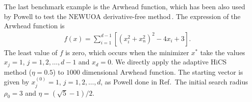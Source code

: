 \documentclass[final,1p,times]{elsarticle}
\begin{document}
%
The last benchmark example is the Arwhead function, which has been
also used by Powell to test the NEWUOA derivative-free
method\,\cite{powell2006newuoa}. The expression of the Arwhead function is
\begin{align}
	f(x) = \sum_{i=1}^{d-1}[(x_i^2+x_n^2)^2 - 4 x_i +3].
	\label{}
\end{align}
The least value of $f$ is zero, which occurs when the minimizer
$x^*$ take the values $x_j=1$, $j=1,2,\dots,d-1$ and $x_d=0$. 
We directly apply the adaptive HiCS method ($\eta=0.5$) to $1000$
dimensional Arwhead function.
The starting vector is given by $x_j^{(0)}=1$, $j=1,2,\dots,d$, as
Powell done in Ref.\,\cite{powell2006newuoa}
The initial search radius $\rho_0=3$ and $\eta=(\sqrt{5}-1)/2$.
\end{document}
